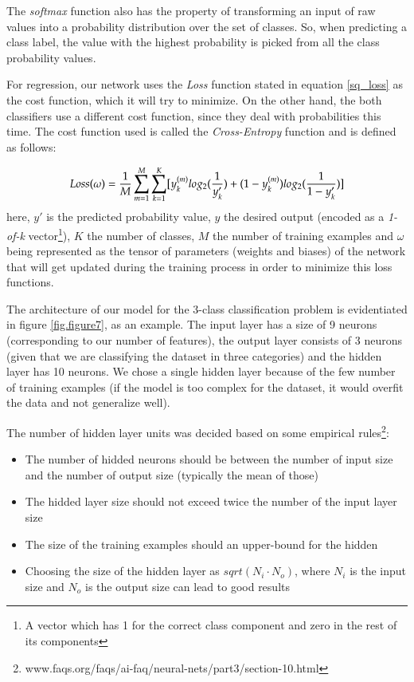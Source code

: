 The {\it softmax} function also has the property of transforming an input of 
raw values into a probability distribution over the set of classes. So, when 
predicting a class label, the value with the highest probability is picked 
from all the class probability values.

For regression, our network uses the {\it Loss} function stated in equation 
\ref{sq_loss} as the cost function, which it will try to minimize. On the other 
hand, the both classifiers use a different cost function, since they deal with 
probabilities this time. The cost function used is called the {\it Cross-Entropy} 
function and is defined as follows:

\begin{equation}
\centering
Loss(\omega) = \frac{1}{M}\sum_{m=1}^M\sum_{k=1}^K [y_{k}^{(m)} log_2(\frac{1}{y'_{k}}) + 
(1-y_{k}^{(m)}) log_2(\frac{1}{1-y'_{k}})]
\end{equation}
here, $y'$ is the predicted probability value, $y$ the desired output (encoded as a 
{\it 1-of-k} vector\footnote{A vector which has 1 for the correct class component and 
zero in the rest of its components}), $K$ the number of classes, $M$ the number of training 
examples and $\omega$ being represented as the tensor of parameters (weights and biases) 
of the network that will get updated during the training process in order to minimize 
this loss functions.

The architecture of our model for the 3-class classification problem is 
evidentiated in figure \ref{fig.figure7}, as an example. The input layer has a 
size of 9 neurons (corresponding to our number of features), the output layer 
consists of 3 neurons (given that we are classifying the dataset in three 
categories) and the hidden layer has 10 neurons. We chose a single hidden layer 
because of the few number of training examples (if the model is too complex 
for the dataset, it would overfit the data and not generalize well).

The number of hidden layer units was decided based on some empirical rules\footnote
{www.faqs.org/faqs/ai-faq/neural-nets/part3/section-10.html}:

\begin{itemize}
\item The number of hidded neurons should be between the number of input size 
and the number of output size (typically the mean of those)
\item The hidded layer size should not exceed twice the number of the input layer size
\item The size of the training examples should an upper-bound for the hidden 
\item Choosing the size of the hidden layer as $sqrt(N_{i} \cdot N_{o})$, where $N_{i}$ 
is the input size and $N_{o}$ is the output size can lead to good results\cite{n_hidden}
\end{itemize}

